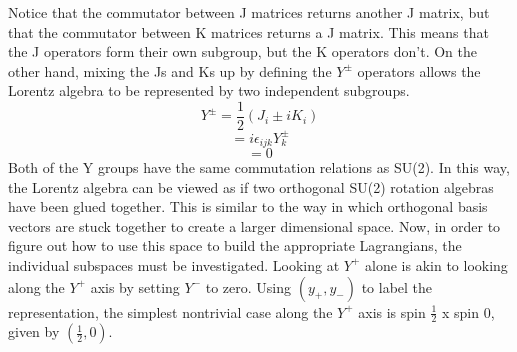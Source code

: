 Notice that the commutator between J matrices returns another J matrix, but that the commutator between K matrices returns a J matrix. This means that the J operators form their own subgroup, but the K operators don't. On the other hand, mixing the Js and Ks up by defining the $Y^{\pm}$ operators allows the Lorentz algebra to be represented by two independent subgroups. 
\begin{equation}
Y^{\pm} = \frac{1}{2}(J_i \pm iK_i)
\end{equation}
\begin{equation}
[Y^{\pm}_i, Y^{\pm}_j] = i\epsilon_{ijk}Y^{\pm}_k
\end{equation}
\begin{equation}
[Y^{\pm}_i, Y^{\mp}_j] = 0
\end{equation}
Both of the Y groups have the same commutation relations as SU(2). In this way, the Lorentz algebra can be viewed as if two orthogonal SU(2) rotation algebras have been glued together. This is similar to the way in which orthogonal basis vectors are stuck together to create a larger dimensional space. Now, in order to figure out how to use this space to build the appropriate Lagrangians, the individual subspaces must be investigated. Looking at $Y^{+}$ alone is akin to looking along the $Y^{+}$ axis by setting $Y^{-}$ to zero. Using $(y_+, y_-)$ to label the representation, the simplest nontrivial case along the $Y^{+}$ axis is spin $\frac{1}{2}$ x spin 0, given by $(\frac{1}{2}, 0)$.   

